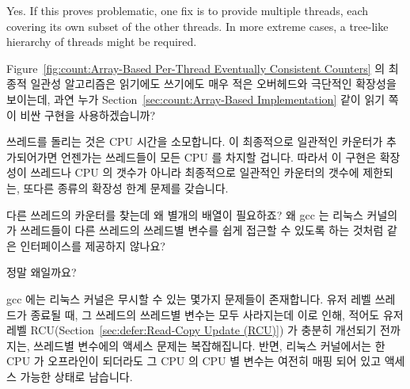 \begin{enumerate}
	Yes.
	If this proves problematic, one fix is to provide multiple
	 threads, each covering its own subset of
	the other threads.
	In more extreme cases, a tree-like hierarchy of
	 threads might be required.
	\fi

\QuickQ{}
	Figure~\ref{fig:count:Array-Based Per-Thread Eventually Consistent
	Counters} 의 최종적 일관성 알고리즘은 읽기에도 쓰기에도 매우 적은
	오버헤드와 극단적인 확장성을 보이는데, 과연 누가
	Section~\ref{sec:count:Array-Based Implementation} 같이 읽기 쪽이 비싼
	구현을 사용하겠습니까?

\QuickA{}
	 쓰레드를 돌리는 것은 CPU 시간을 소모합니다. 이
	최종적으로 일관적인 카운터가 추가되어가면 언젠가는 
	쓰레드들이 모든 CPU 를 차지할 겁니다.
	따라서 이 구현은 확장성이 쓰레드나 CPU 의 갯수가 아니라 최종적으로
	일관적인 카운터의 갯수에 제한되는, 또다른 종류의 확장성 한계 문제를
	갖습니다.

\QuickQ{}
	다른 쓰레드의 카운터를 찾는데 왜 별개의 배열이 필요하죠?
	왜 gcc 는 리눅스 커널의  가 쓰레드들이 다른 쓰레드의
	쓰레드별 변수를 쉽게 접근할 수 있도록 하는 것처럼 
	같은 인터페이스를 제공하지 않나요?

\QuickA{}
	정말 왜일까요?

	gcc 에는 리눅스 커널은 무시할 수 있는 몇가지 문제들이 존재합니다.
	유저 레벨 쓰레드가 종료될 때, 그 쓰레드의 쓰레드별 변수는 모두
	사라지는데 이로 인해, 적어도 유저 레벨
	RCU(Section~\ref{sec:defer:Read-Copy Update
	(RCU)}) 가 충분히 개선되기 전까지는, 쓰레드별 변수에의 액세스 문제는
	복잡해집니다.
	반면, 리눅스 커널에서는 한 CPU 가 오프라인이 되더라도 그 CPU 의 CPU 별
	변수는 여전히 매핑 되어 있고 액세스 가능한 상태로 남습니다.
	\iffalse


\end{enumerate}
